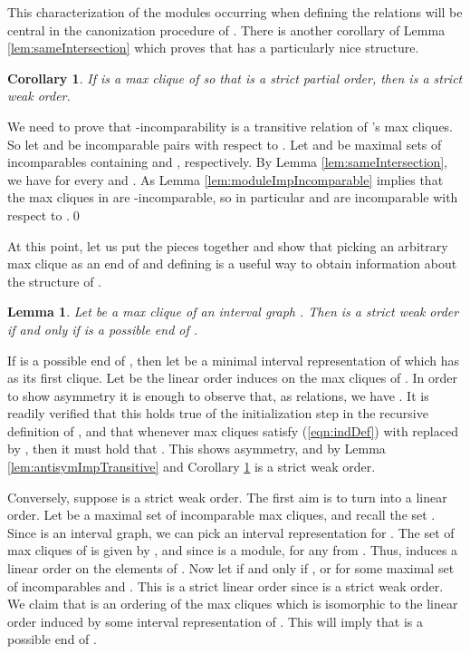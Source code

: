 \documentclass[10pt]{article}
\newtheorem{cor}[thm]{Corollary}
\newtheorem{lem}[thm]{Lemma}
\theoremstyle{remark}
\theoremstyle{definition}
\theoremstyle{plain}
\begin{document}
This characterization of the modules occurring when defining the relations  will be central in the canonization procedure of . There is another corollary of Lemma \ref{lem:sameIntersection} which proves that  has a particularly nice structure.


\begin{cor}\label{cor:strictOrderImpWeakOrder}
 If  is a max clique of  so that  is a strict partial order, then  is a strict weak order.
\end{cor}

\proof We need to prove that -incomparability is a transitive relation of 's max cliques. So let  and  be incomparable pairs with respect to . Let  and  be maximal sets of incomparables containing  and , respectively. By Lemma \ref{lem:sameIntersection}, we have  for every  and . As  Lemma \ref{lem:moduleImpIncomparable} implies that the max cliques in  are -incomparable, so in particular  and  are incomparable with respect to .\qed



At this point, let us put the pieces together and show that picking an arbitrary max clique  as an end of  and defining  is a useful way to obtain information about the structure of .

\begin{lem} \label{lem:partialOrderEqEnd}
Let  be a max clique of an interval graph . Then  is a strict weak order if and only if  is a possible end of .
\end{lem}

\proof If  is a possible end of , then let  be a minimal interval representation of  which has  as its first clique. Let  be the linear order  induces on the max cliques of . In order to show asymmetry it is enough to observe that, as relations, we have . It is readily verified that this holds true of the initialization step in the recursive definition of , and that whenever max cliques  satisfy (\ref{eqn:indDef}) with  replaced by , then it must hold that . This shows asymmetry, and by Lemma \ref{lem:antisymImpTransitive} and Corollary \ref{cor:strictOrderImpWeakOrder}  is a strict weak order.

Conversely, suppose  is a strict weak order. The first aim is to turn  into a linear order. Let  be a maximal set of incomparable max cliques, and recall the set . Since  is an interval graph, we can pick an interval representation  for . The set of max cliques of  is given by , and since  is a module,  for any  from . Thus,  induces a linear order  on the elements of . Now let  if and only if , or  for some maximal set of incomparables  and . This is a strict linear order since  is a strict weak order. We claim that  is an ordering of the max cliques which is isomorphic to the linear order induced by some interval representation of . This will imply that  is a possible end of .
\end{document}
